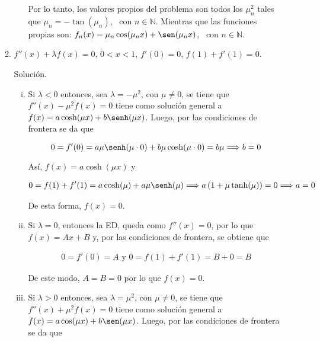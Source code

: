 \documentclass[fleqn]{article}
\newcommand{\nat}{\mathbb{N}}
\begin{document}
\begin{enumerate}[I.]
\begin{enumerate}
\begin{enumerate}[i)]
				Por lo tanto, los valores propios del problema son todos los $ \mu_n^2 $ tales que $ \mu_n = - \tan (\mu_n) $, \, con $ n \in \nat $. Mientras que las funciones propias son: $ f_n (x) = \mu_n \cos(\mu_n x) + \sen(\mu_n x) $, \, con $ n \in \nat $.
			\end{enumerate}


			\bfseries
			
			\item $ f''(x) + \lambda f(x) = 0 $, $ 0 < x < 1 $, $ f'(0) = 0 $, $ f(1) + f'(1) = 0 $.
			
			Solución.
			
			\normalfont

			\begin{enumerate}[i)]
				\item Si $ \lambda < 0 $ entonces, sea $ \lambda = - \mu^2 $, con $ \mu \neq 0 $, se tiene que $ f''(x) - \mu^2 f(x) = 0 $
				tiene como solución general a $ f(x) = a \cosh(\mu x) + b \senh(\mu x) $. Luego, por las condiciones de frontera se da que
				
				\begin{equation*}
					0 = f'(0) = a \mu \senh(\mu \cdot 0) + b \mu \cosh(\mu \cdot 0) = b \mu \Longrightarrow b = 0 
				\end{equation*}

				Así, $ f(x) = a \cosh(\mu x) $ y 

				\begin{align*}
					0 = f(1) + f'(1) = a \cosh(\mu) + a \mu \senh(\mu) \Longrightarrow a \left( 1 + \mu \tanh(\mu) \right) = 0 \Longrightarrow a = 0
				\end{align*}
				
				De esta forma, $ f(x) = 0 $.

				\item Si $ \lambda = 0 $, entonces la ED, queda como $ f''(x) = 0 $, por lo que $ f(x) = Ax + B $ y, por las condiciones de frontera, se obtiene que 
				
				\begin{align*}
					0 = f'(0) = A \mbox{ y } 0 = f(1) + f'(1) = B + 0 = B
				\end{align*}

				De este modo, $ A = B = 0 $ por lo que $ f(x) = 0 $.
				
				\item Si $ \lambda > 0 $ entonces, sea $ \lambda = \mu^2 $, con $ \mu \neq 0 $, se tiene que $ f''(x) + \mu^2 f(x) = 0 $
				tiene como solución general a $ f(x) = a \cos(\mu x) + b \sen(\mu x) $. Luego, por las condiciones de frontera se da que
				

\end{enumerate}
\end{enumerate}
\end{enumerate}
\end{document}
